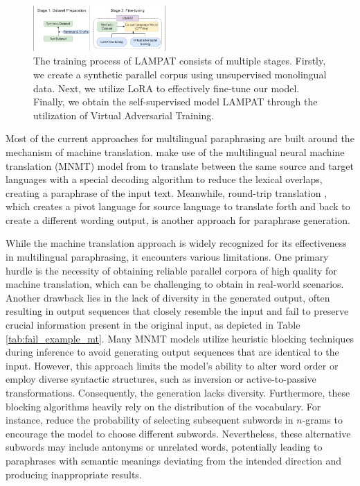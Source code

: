 \documentclass[letterpaper]{article} %
\begin{document}
\begin{figure}[h]
    \centering
    \includegraphics[width=0.45\textwidth]{images/rebuttal-overview_figure_2.drawio.png}
    \caption{The training process of LAMPAT consists of multiple stages. Firstly, we create a synthetic parallel corpus using unsupervised monolingual data. Next, we utilize LoRA to effectively fine-tune our model. Finally, we obtain the self-supervised model LAMPAT through the utilization of Virtual Adversarial Training.}
    \label{fig:lampat-architecture}
\end{figure}

Most of the current approaches for multilingual paraphrasing are built around the mechanism of machine translation. \citet{thompson-post-2020-paraphrase} make use of the multilingual neural machine translation (MNMT) model from \citet{thompson-post-2020-automatic} to translate between the same source and target languages with a special decoding algorithm to reduce the lexical overlaps, creating a paraphrase of the input text. Meanwhile, round-trip translation \citep{federmann-etal-2019-multilingual}, which creates a pivot language for source language to translate forth and back to create a different wording output, is another approach for paraphrase generation.

While the machine translation approach is widely recognized for its effectiveness in multilingual paraphrasing, it encounters various limitations. One primary hurdle is the necessity of obtaining reliable parallel corpora of high quality for machine translation, which can be challenging to obtain in real-world scenarios. Another drawback lies in the lack of diversity in the generated output, often resulting in output sequences that closely resemble the input and fail to preserve crucial information present in the original input, as depicted in Table \ref{tab:fail_example_mt}. Many MNMT models utilize heuristic blocking techniques during inference to avoid generating output sequences that are identical to the input. However, this approach limits the model's ability to alter word order or employ diverse syntactic structures, such as inversion or active-to-passive transformations. Consequently, the generation lacks diversity. Furthermore, these blocking algorithms heavily rely on the distribution of the vocabulary. For instance, \citet{thompson-post-2020-paraphrase} reduce the probability of selecting subsequent subwords in $n$-grams to encourage the model to choose different subwords. Nevertheless, these alternative subwords may include antonyms or unrelated words, potentially leading to paraphrases with semantic meanings deviating from the intended direction and producing inappropriate results.
\end{document}
